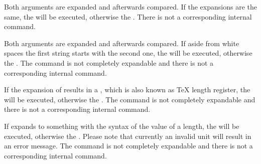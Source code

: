 \begin{Declaration}
\end{Declaration}
%
Both  arguments are expanded and afterwards compared. If the
expansions are the same, the  will be executed,
otherwise the . There is not a corresponding internal
command.
%
%

\begin{Declaration}
\end{Declaration}
%
Both  arguments are
expanded and afterwards compared. If aside from white spaces the first string
starts with the second one, the  will be executed,
otherwise the . The command is not completely
expandable and there is not a corresponding internal command.%
%

\begin{Declaration}
\end{Declaration}
%
If the expansion of results in
a , which is also known as \TeX{} length register, the
 will be executed, otherwise the . The command is not completely expandable and there is not a
corresponding internal command.%
%

\begin{Declaration}
\end{Declaration}
%
If  expands to something with
the syntax of the value of a length, the  will be
executed, otherwise the . Please
note that currently an invalid unit will result in an
error message. The command is not completely expandable and there is not a
corresponding internal command.%
%

